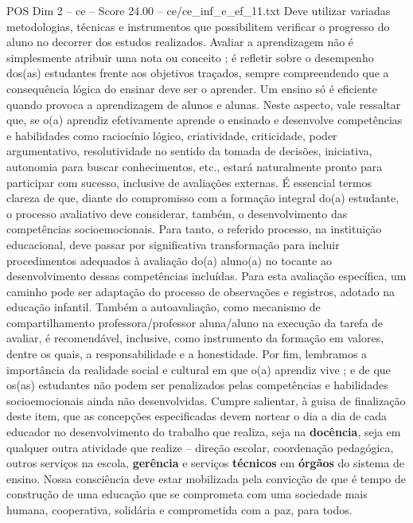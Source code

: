 \begin{textsample}{POS Dim 2 – ce – Score 24.00 – ce/ce\_inf\_e\_ef\_11.txt}
Deve utilizar variadas metodologias, técnicas e instrumentos que possibilitem verificar o progresso do aluno no decorrer dos estudos realizados.
Avaliar a aprendizagem não é simplesmente atribuir uma nota ou conceito ; é refletir sobre o desempenho dos(as) estudantes frente aos objetivos traçados, sempre compreendendo que a consequência lógica do ensinar deve ser o aprender.
Um ensino só é eficiente quando provoca a aprendizagem de alunos e alunas.
Neste aspecto, vale ressaltar que, se o(a) aprendiz efetivamente aprende o ensinado e desenvolve competências e habilidades como raciocínio lógico, criatividade, criticidade, poder argumentativo, resolutividade no sentido da tomada de decisões, iniciativa, autonomia para buscar conhecimentos, etc., estará naturalmente pronto para participar com sucesso, inclusive de avaliações externas.
É essencial termos clareza de que, diante do compromisso com a formação integral do(a) estudante, o processo avaliativo deve considerar, também, o desenvolvimento das competências socioemocionais.
Para tanto, o referido processo, na instituição educacional, deve passar por significativa transformação para incluir procedimentos adequados à avaliação do(a) aluno(a) no tocante ao desenvolvimento dessas competências incluídas.
Para esta avaliação específica, um caminho pode ser adaptação do processo de observações e registros, adotado na educação infantil.
Também a autoavaliação, como mecanismo de compartilhamento professora/professor aluna/aluno na execução da tarefa de avaliar, é recomendável, inclusive, como instrumento da formação em valores, dentre os quais, a responsabilidade e a honestidade.
Por fim, lembramos a importância da realidade social e cultural em que o(a) aprendiz vive ; e de que os(as) estudantes não podem ser penalizados pelas competências e habilidades socioemocionais ainda não desenvolvidas.
Cumpre salientar, à guisa de finalização deste item, que as concepções especificadas devem nortear o dia a dia de cada educador no desenvolvimento do trabalho que realiza, seja na \textbf{docência}, seja em qualquer outra atividade que realize – direção escolar, coordenação pedagógica, outros serviços na escola, \textbf{gerência} e serviços \textbf{técnicos} em \textbf{órgãos} do sistema de ensino.
Nossa consciência deve estar mobilizada pela convicção de que é tempo de construção de uma educação que se comprometa com uma sociedade mais humana, cooperativa, solidária e comprometida com a paz, para todos.

\end{textsample}
